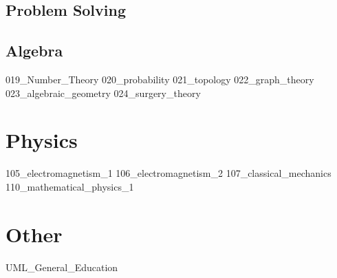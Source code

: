 \documentclass[crop=false,class=book,oneside]{standalone}
\begin{document}
        \chapter{Problem Solving}
        \chapter{Algebra}
        {019_Number_Theory}
        {020_probability}
        {021_topology}
        {022_graph_theory}
        {023_algebraic_geometry}
        {024_surgery_theory}
    \part{Physics}
        {105_electromagnetism_1}
        {106_electromagnetism_2}
        {107_classical_mechanics}
        {110_mathematical_physics_1}
    \part{Other}
        {UML_General_Education}
\end{document}
